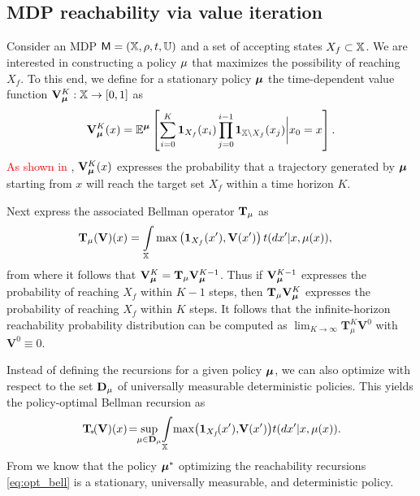 \documentclass{ifacconf}
\newcommand{\ind}{\mathbf{1}}
\begin{document}
\subsection{MDP reachability via value iteration}

Consider an MDP $\mathsf{M} = ({\mathbb{X}}, \rho, t, {\mathbb{U}})$ and a set of accepting states $X_f \subset {\mathbb{X}}$. We are interested in constructing a policy ${\mu}$ that maximizes the possibility of reaching $X_f$. To this end, we define for a stationary policy ${\boldsymbol{\mu}}$ the time-dependent value function $\mathbf V_{\boldsymbol{\mu}}^K:{\mathbb{X}}\rightarrow [0,1]$ as
\begin{equation*}
\label{eq:Valfunc}
  \mathbf V^K_\polb(x)=\mathbb{E}^\polb \left[ \sum\limits_{ i=0 }^K \ind_{X_f}( x_i) \prod \limits_{\mathclap{j = 0}}^{i-1}\ind_{ \X \setminus X_f}( x_j ) \bigg| x_0 = x \right].
\end{equation*}
\textcolor{red}{As shown in \citep{Abate1}}, $\mathbf V_{\boldsymbol{\mu}}^K (x)$ expresses the probability that a trajectory generated by ${\boldsymbol{\mu}}$ starting from $x$ will reach the target set $X_f$ within a time horizon $K$.

Next express the associated Bellman operator ${\mathbf {T}}_{\mu}$ as
\begin{align}
\label{eq:V_recopt}
  & \Bel_\pol (\mathbf  V)(x) = \int_\X \max \left( \mathbf 1_{X_f}( x'), \mathbf V(x') \right) {\tr}(d  x' | x,\pol( x)),
\end{align}
from where it follows that $\mathbf V_{\boldsymbol{\mu}}^{K} = {\mathbf {T}}_{\mu} \mathbf V_{\boldsymbol{\mu}}^{K-1}$. Thus if $\mathbf V_{\boldsymbol{\mu}}^{K-1} $ expresses the probability of reaching $X_f$ within $K-1$ steps, then $ {\mathbf {T}}_{\mu} \mathbf V_{\boldsymbol{\mu}}^{K} $ expresses the probability of reaching $X_f$ within $K$ steps. It follows that the infinite-horizon reachability probability distribution can be computed as $\lim_{K\rightarrow \infty}\mathbf T_\mu^{K} \mathbf V^0$ with $\mathbf{V}^0 \equiv 0$.

Instead of defining the recursions for a given policy ${\boldsymbol{\mu}}$, we can also optimize with respect to the set $\mathbf D_{{\mu}}$ of universally measurable deterministic policies. This yields the policy-optimal Bellman recursion as
\begin{equation}
  \Bel_{\!\ast} \!(\mathbf V)(x) \!=\!\!\sup_{\pol \in \mathbf D_{\pol}}\! \int_{\X}\! \max\! \left( \mathbf 1_{X_f}\!( x'),\! \mathbf V(x') \right)\! {\tr}(d  x' | x,\pol( x)).\!\label{eq:opt_bell}
\end{equation}
From \cite{Abate1} we know that the policy ${\boldsymbol{\mu}}^\ast$ optimizing  the reachability recursions \eqref{eq:opt_bell}  is a stationary, universally measurable, and deterministic policy.
\end{document}
